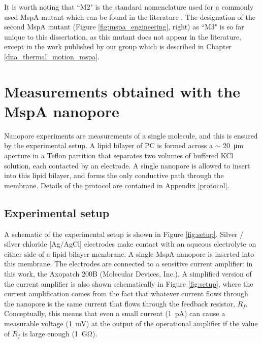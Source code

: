 It is worth noting that ``M2" is the standard nomenclature used for a commonly used MspA mutant which can be found in the literature \citep{Butler2008,Manrao2012,Schreiber2013,Derrington2015}.  The designation of the second MspA mutant (Figure \ref{fig:mspa_engineering}, right) as ``M3" is so far unique to this dissertation, as this mutant does not appear in the literature, except in the work published by our group \citep{Lu2015,Fleming2017} which is described in Chapter \ref{dna_thermal_motion_mspa}.


\section{Measurements obtained with the MspA nanopore}

Nanopore experiments are measurements of a single molecule, and this is ensured by the experimental setup.  A lipid bilayer of PC is formed across a $\sim$ \SI{20}{\um} aperture in a Teflon partition that separates two volumes of buffered KCl solution, each contacted by an electrode.  A single nanopore is allowed to insert into this lipid bilayer, and forms the only conductive path through the membrane.  Details of the protocol are contained in Appendix \ref{protocol}.

\subsection{Experimental setup}

A schematic of the experimental setup is shown in Figure \ref{fig:setup}.  Silver / silver chloride [Ag/AgCl] electrodes make contact with an aqueous electrolyte on either side of a lipid bilayer membrane.  A single MspA nanopore is inserted into this membrane.  The electrodes are connected to a sensitive current amplifier: in this work, the Axopatch 200B (Molecular Devices, Inc.).  A simplified version of the current amplifier is also shown schematically in Figure \ref{fig:setup}, where the current amplification comes from the fact that whatever current flows through the nanopore is the same current that flows through the feedback resistor, $R_f$.  Conceptually, this means that even a small current (\SI{1}{\pA}) can cause a measurable voltage (\SI{1}{\mV}) at the output of the operational amplifier if the value of $R_f$ is large enough (\SI{1}{\giga\ohm}).

